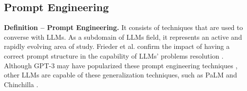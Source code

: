 \subsection{Prompt Engineering}


\textbf{Definition -- Prompt Engineering.} It consists of techniques that are used to converse with LLMs. As a subdomain of LLMs field, it represents an active and rapidly evolving area of study. Frieder et al. confirm the impact of having a correct prompt structure in the capability of LLMs' problems resolution \cite{10.5555/3666122.3667327}. 
Although GPT-3 may have popularized these prompt engineering techniques \cite{10.5555/3495724.3495883}, other LLMs are capable of these generalization techniques, such as PaLM \cite{10.5555/3648699.3648939} and Chinchilla \cite{10.5555/3600270.3602446}.

